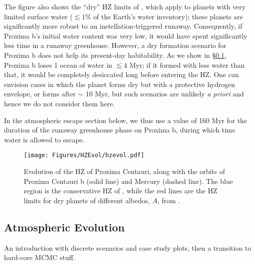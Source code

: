 \documentclass[preprint,12pt]{aastex}
\newcommand{\xxx}[1]{{\color{red} #1}} %
\begin{document}
The figure also shows the ``dry'' HZ limits of \cite{Abe11}, which
apply to planets with very limited surface water ($\lesssim 1\%$ of
the Earth's water inventory); these planets are significantly more
robust to an instellation-triggered runaway. Consequently, if Proxima
b's initial water content was very low, it would have spent
significantly less time in a runaway greenhouse. However, a dry
formation scenario for Proxima b does not help its present-day
habitability. As we show in \S\ref{sec:results:atmesc}, Proxima b
loses 1 ocean of water in $\lesssim 4$ Myr; if it formed with less water
than that, it would be completely desiccated long before entering the
\cite{Abe11} HZ. One can envision cases in which the planet forms dry
but with a protective hydrogen envelope, or forms after $\sim$ 10 Myr,
but such scenarios are unlikely \emph{a priori} and hence we do not consider
them here.

In the atmospheric escape section below, we thus use a value of 160
Myr for the duration of the runaway greenhouse phase on Proxima b,
during which time water is allowed to escape.

\begin{figure}[ht]
\centering
\texttt{[image: Figures/HZEvol/hzevol.pdf]}
\caption{Evolution of the HZ of Proxima Centauri, along with the orbits of Proxima Centauri b (solid line) 
and Mercury (dashed line). The blue region is the conservative HZ of \cite{Kopparapu13}, while the red lines
are the HZ limits for dry planets of different albedos, $A$, from \cite{Abe11}.}
\label{fig:HZEvol}
\end{figure}

\subsection{Atmospheric Evolution}
\label{sec:results:atmesc}

\xxx{An introduction with discrete scenarios and case study plots, then a 
transition to hard-core MCMC stuff.}
\end{document}

